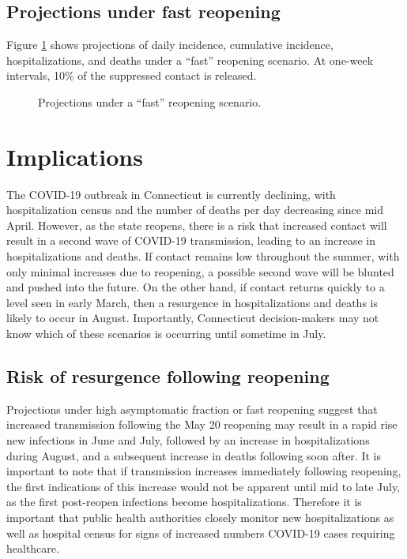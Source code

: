 \documentclass[11pt]{article}
\newcommand{\comment}[1]{[\textcolor{red}{#1}]}
\begin{document}
\subsection*{Projections under fast reopening} 

Figure \ref{fig:fast} shows projections of daily incidence, cumulative incidence, hospitalizations, and deaths under a ``fast'' reopening scenario. At one-week intervals, 10\% of the suppressed contact is released.   

\begin{figure}
\centering
\comment{fast reopen placeholder}
\caption{Projections under a ``fast'' reopening scenario. }
\label{fig:fast}
\end{figure}






\section*{Implications}

The COVID-19 outbreak in Connecticut is currently declining, with hospitalization census and the number of deaths per day decreasing since mid April.  However, as the state reopens, there is a risk that increased contact will result in a second wave of COVID-19 transmission, leading to an increase in hospitalizations and deaths.  If contact remains low throughout the summer, with only minimal increases due to reopening, a possible second wave will be blunted and pushed into the future.  On the other hand, if contact returns quickly to a level seen in early March, then a resurgence in hospitalizations and deaths is likely to occur in August.  Importantly, Connecticut decision-makers may not know which of these scenarios is occurring until sometime in July.  


\subsection*{Risk of resurgence following reopening} 

Projections under high asymptomatic fraction or fast reopening suggest that increased transmission following the May 20 reopening may result in a rapid rise new infections in June and July, followed by an increase in hospitalizations during August, and a subsequent increase in deaths following soon after.  It is important to note that if transmission increases immediately following reopening, the first indications of this increase would not be apparent until mid to late July, as the first post-reopen infections become hospitalizations.  Therefore it is important that public health authorities closely monitor new hospitalizations as well as hospital census for signs of increased numbers COVID-19 cases requiring healthcare.   
\end{document}
